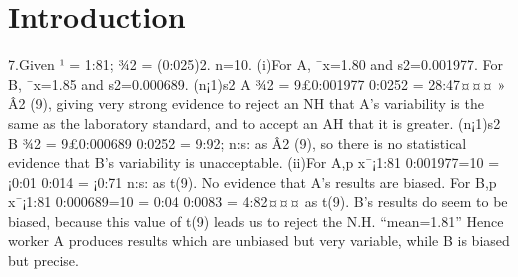 \documentclass{article}
\begin{document}
\maketitle

\section{Introduction}

7.Given ¹ = 1:81; ¾2 = (0:025)2. n=10.
(i)For A, ¯x=1.80 and s2=0.001977.
For B, ¯x=1.85 and s2=0.000689.
(n¡1)s2
A
¾2 = 9£0:001977
0:0252 = 28:47¤¤¤ » Â2
(9), giving very strong evidence to reject an NH that A’s
variability is the same as the laboratory standard, and to accept an AH that it is greater.
(n¡1)s2
B
¾2 = 9£0:000689
0:0252 = 9:92; n:s: as Â2
(9), so there is no statistical evidence that B’s variability
is unacceptable.
(ii)For A,p x¯¡1:81
0:001977=10
= ¡0:01
0:014 = ¡0:71 n:s: as t(9).
No evidence that A’s results are biased.
For B,p x¯¡1:81
0:000689=10
= 0:04
0:0083 = 4:82¤¤¤ as t(9).
B’s results do seem to be biased, because this value of t(9) leads us to reject the N.H. “mean=1.81”
Hence worker A produces results which are unbiased but very variable, while B is biased but precise.
\end{document}
